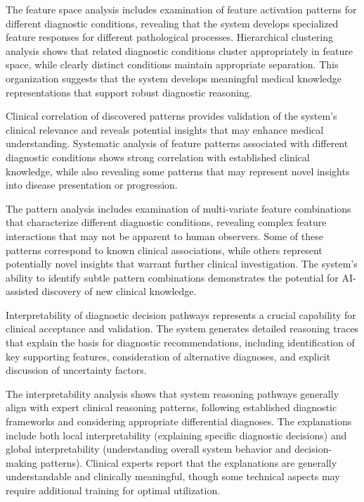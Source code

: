 The feature space analysis includes examination of feature activation patterns for different diagnostic conditions, revealing that the system develops specialized feature responses for different pathological processes. Hierarchical clustering analysis shows that related diagnostic conditions cluster appropriately in feature space, while clearly distinct conditions maintain appropriate separation. This organization suggests that the system develops meaningful medical knowledge representations that support robust diagnostic reasoning.

Clinical correlation of discovered patterns provides validation of the system's clinical relevance and reveals potential insights that may enhance medical understanding. Systematic analysis of feature patterns associated with different diagnostic conditions shows strong correlation with established clinical knowledge, while also revealing some patterns that may represent novel insights into disease presentation or progression.

The pattern analysis includes examination of multi-variate feature combinations that characterize different diagnostic conditions, revealing complex feature interactions that may not be apparent to human observers. Some of these patterns correspond to known clinical associations, while others represent potentially novel insights that warrant further clinical investigation. The system's ability to identify subtle pattern combinations demonstrates the potential for AI-assisted discovery of new clinical knowledge.

Interpretability of diagnostic decision pathways represents a crucial capability for clinical acceptance and validation. The system generates detailed reasoning traces that explain the basis for diagnostic recommendations, including identification of key supporting features, consideration of alternative diagnoses, and explicit discussion of uncertainty factors.

The interpretability analysis shows that system reasoning pathways generally align with expert clinical reasoning patterns, following established diagnostic frameworks and considering appropriate differential diagnoses. The explanations include both local interpretability (explaining specific diagnostic decisions) and global interpretability (understanding overall system behavior and decision-making patterns). Clinical experts report that the explanations are generally understandable and clinically meaningful, though some technical aspects may require additional training for optimal utilization.

